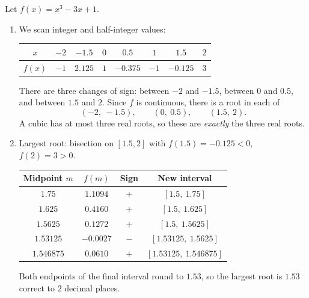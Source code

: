 \documentclass[11pt]{article}
\begin{document}
\begin{corrige}
Let $f(x) = x^{3} - 3x + 1$.
\begin{enumerate}
\item We scan integer and half-integer values:
\begin{center}
\begin{tabular}{|c|ccccccc|}
\hline
\rowcolor{popblueL} $x$ & $-2$ & $-1.5$ & $0$ & $0.5$ & $1$ & $1.5$ & $2$ \\
\hline
$f(x)$ & $-1$ & $2.125$ & $1$ & $-0.375$ & $-1$ & $-0.125$ & $3$ \\
\hline
\end{tabular}
\end{center}
There are three changes of sign: between $-2$ and $-1.5$, between $0$ and $0.5$, and between $1.5$ and $2$. Since $f$ is continuous, there is a root in each of
\[ (-2,\ -1.5), \qquad (0,\ 0.5), \qquad (1.5,\ 2). \]
A cubic has at most three real roots, so these are \emph{exactly} the three real roots.
\item Largest root: bisection on $[1.5, 2]$ with $f(1.5) = -0.125 < 0$, $f(2) = 3 > 0$.
\begin{center}
\begin{tabular}{|c|c|c|c|}
\hline
\rowcolor{popblueL} Midpoint $m$ & $f(m)$ & Sign & New interval \\
\hline
$1.75$ & $1.1094$ & $+$ & $[1.5,\ 1.75]$ \\
$1.625$ & $0.4160$ & $+$ & $[1.5,\ 1.625]$ \\
$1.5625$ & $0.1272$ & $+$ & $[1.5,\ 1.5625]$ \\
$1.53125$ & $-0.0027$ & $-$ & $[1.53125,\ 1.5625]$ \\
$1.546875$ & $0.0610$ & $+$ & $[1.53125,\ 1.546875]$ \\
\hline
\end{tabular}
\end{center}
Both endpoints of the final interval round to $1.53$, so the largest root is $\boxed{1.53}$ correct to $2$ decimal places.
\end{enumerate}
\end{corrige}
\end{document}
